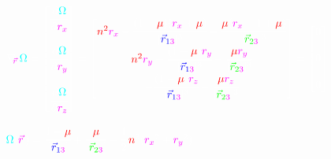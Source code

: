 \documentclass{article}
\begin{document}
$
\color{white}\nabla_{\!\!\color{mag}\vec{r}}\,
\color{cyan}\Omega\color{white}=
\begin{bmatrix}
	\color{white}\cfrac{\partial\color{cyan}\Omega}{\partial \color{mag}r_x} \\\\
	\color{white}\cfrac{\partial\color{cyan}\Omega}{\partial \color{mag}r_y} \\\\
	\color{white}\cfrac{\partial\color{cyan}\Omega}{\partial \color{mag}r_z}
\end{bmatrix}
=
\begin{bmatrix}
	\color{red}n^2\color{mag}r_x\color{white}-
	\cfrac{(1-\color{red}\mu\color{white})(\color{mag}r_x\color{white}+\color{red}\mu\color{white})}
	{|\color{blue}\vec{r}_{1\color{mag}3}\color{white}|^3}-
	\cfrac{\color{red}\mu\color{white}(\color{mag}r_x\color{white}-1+\color{red}\mu\color{white})}
	{|\color{green}\vec{r}_{2\color{mag}3}\color{white}|^3} \\

	\color{red}n^2\color{mag}r_y\color{white}-
	\cfrac{(1-\color{red}\mu\color{white})\color{mag}r_y}
	{|\color{blue}\vec{r}_{1\color{mag}3}\color{white}|^3}-
	\cfrac{\color{red}\mu\color{white}\color{mag}r_y}
	{|\color{green}\vec{r}_{2\color{mag}3}\color{white}|^3} \\

	-\cfrac{(1-\color{red}\mu\color{white})\color{mag}r_z}
	{|\color{blue}\vec{r}_{1\color{mag}3}\color{white}|^3}-
	\cfrac{\color{red}\mu\color{white}\color{mag}r_z}
	{|\color{green}\vec{r}_{2\color{mag}3}\color{white}|^3}
\end{bmatrix}
=
\begin{bmatrix}
	0 \\\\ 0 \\\\ 0
\end{bmatrix}
$

$
\color{cyan}\Omega\color{white}(\color{mag}\vec{r}\color{white}\,)=
\cfrac{1-\color{red}\mu\color{white}}{\color{white}|\color{blue}\vec{r}_{1\color{mag}3\color{white}}\color{white}|}+
\cfrac{\color{red}\mu\color{white}}{\color{white}|\color{green}\vec{r}_{2\color{mag}3\color{white}}\color{white}|}+
\cfrac{1}{2}\,\color{red}n^{\color{white}2}\color{white}
(\color{mag}r_{\color{mag}x}^{\color{white}2}\color{white}+\color{mag}r_{\color{mag}y}^{\color{white}2}\color{white})
$\\\\
\end{document}
